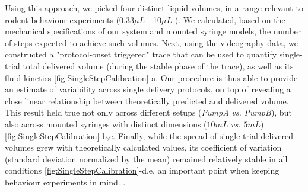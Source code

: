 Using this approach, we picked four distinct liquid volumes, in a range relevant to rodent behaviour experiments (0.33$\mu L$ - 10$\mu L$ ). We calculated, based on the mechanical specifications of our system and mounted syringe models, the number of steps expected to achieve such volumes. Next, using the videography data, we constructed a "protocol-onset triggered" trace that can be used to quantify single-trial total delivered volume (during the stable phase of the trace), as well as its fluid kinetics \ref{fig:SingleStepCalibration}-a. Our procedure is thus able to provide an estimate of variability across single delivery protocols, on top of revealing a close linear relationship between theoretically predicted and delivered volume. This result held true not only across different setups (\textit{PumpA} \textit{vs.} \textit{PumpB}), but also across mounted syringes with distinct dimensions ($10mL$ \textit{vs.} $5mL$) \ref{fig:SingleStepCalibration}-b,c. Finally, while the spread of single trial delivered volumes grew with theoretically calculated values, its coefficient of variation (standard deviation normalized by the mean) remained relatively stable in all conditions \ref{fig:SingleStepCalibration}-d,e, an important point when keeping behaviour experiments in mind. .

